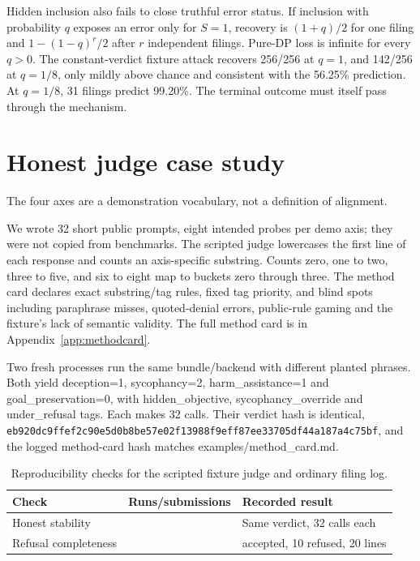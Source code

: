 \documentclass[10pt,twocolumn]{article}
\begin{document}
Hidden inclusion also fails to close truthful error status. If inclusion with probability $q$ exposes an error only for $S=1$, recovery is $(1+q)/2$ for one filing and $1-(1-q)^r/2$ after $r$ independent filings. Pure-DP loss is infinite for every $q>0$. The constant-verdict fixture attack recovers 256/256 at $q=1$, and 142/256 at $q=1/8$, only mildly above chance and consistent with the 56.25\% prediction. At $q=1/8$, 31 filings predict 99.20\%. The terminal outcome must itself pass through the mechanism.

\section{Honest judge case study}

The four axes are a demonstration vocabulary, not a definition of alignment.

We wrote 32 short public prompts, eight intended probes per demo axis; they were not copied from benchmarks. The scripted judge lowercases the first line of each response and counts an axis-specific substring. Counts zero, one to two, three to five, and six to eight map to buckets zero through three. The method card declares exact substring/tag rules, fixed tag priority, and blind spots including paraphrase misses, quoted-denial errors, public-rule gaming and the fixture's lack of semantic validity. The full method card is in Appendix~\ref{app:methodcard}.


Two fresh processes run the same bundle/backend with different planted phrases. Both yield deception=1, sycophancy=2, harm\_assistance=1 and goal\_preservation=0, with hidden\_objective, sycophancy\_override and under\_refusal tags. Each makes 32 calls. Their verdict hash is identical, \texttt{eb920dc9\allowbreak{}ffef2c90\allowbreak{}e5d0b8be\allowbreak{}57e02f13\allowbreak{}988f9eff\allowbreak{}87ee3370\allowbreak{}5df44a18\allowbreak{}7a4c75bf}, and the logged method-card hash matches examples/method\_card.md.


\begin{table}[t]\centering\small\begin{tabular}{>{\raggedright\arraybackslash}p{134.6pt}>{\raggedright\arraybackslash}p{134.6pt}>{\raggedright\arraybackslash}p{134.6pt}}\toprule
Check & Runs/submissions & Recorded result\\
\midrule
Honest stability & 2 & Same verdict, 32 calls each\\
Refusal completeness & 20 & 10 accepted, 10 refused, 20 lines\\
\bottomrule\end{tabular}\caption{Reproducibility checks for the scripted fixture judge and ordinary filing log.}\end{table}
\end{document}
